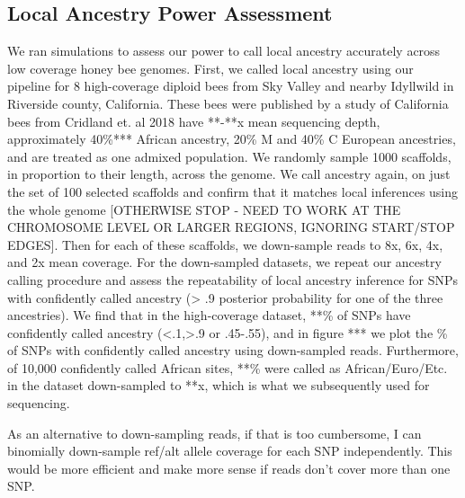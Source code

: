 \documentclass[12pt]{report}
\begin{document}
\subsection{Local Ancestry Power Assessment}
We ran simulations to assess our power to call local ancestry accurately across low coverage honey bee genomes. First, we called local ancestry using our pipeline for 8 high-coverage diploid bees from Sky Valley and nearby Idyllwild in Riverside county, California. These bees were published by a study of California bees from Cridland et. al 2018 have **-**x mean sequencing depth, approximately 40\%*** African ancestry, 20\% M and 40\% C European ancestries, and are treated as one admixed population. We randomly sample 1000 scaffolds, in proportion to their length, across the genome. We call ancestry again, on just the set of 100 selected scaffolds and confirm that it matches local inferences using the whole genome [OTHERWISE STOP - NEED TO WORK AT THE CHROMOSOME LEVEL OR LARGER REGIONS, IGNORING START/STOP EDGES]. Then for each of these scaffolds, we down-sample reads to 8x, 6x, 4x, and 2x mean coverage. For the down-sampled datasets, we repeat our ancestry calling procedure and assess the repeatability of local ancestry inference for SNPs with confidently called ancestry (> .9 posterior probability for one of the three ancestries). We find that in the high-coverage dataset, **\% of SNPs have confidently called ancestry (<.1,>.9 or .45-.55), and in figure *** we plot the \% of SNPs with confidently called ancestry using down-sampled reads. Furthermore, of 10,000 confidently called African sites, **\% were called as African/Euro/Etc. in the dataset down-sampled to **x, which is what we subsequently used for sequencing. \par
As an alternative to down-sampling reads, if that is too cumbersome, I can binomially down-sample ref/alt allele coverage for each SNP independently. This would be more efficient and make more sense if reads don't cover more than one SNP.
\end{document}
